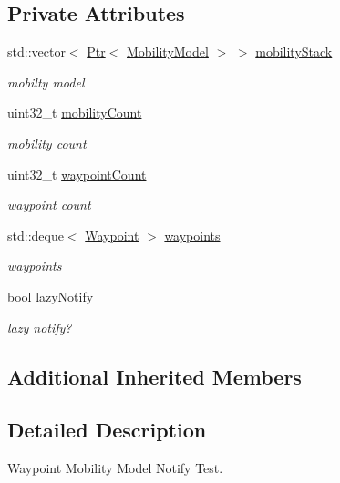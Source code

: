 \subsection*{Private Attributes}
\begin{DoxyCompactItemize}
\item 
std\+::vector$<$ \hyperlink{classns3_1_1Ptr}{Ptr}$<$ \hyperlink{classns3_1_1MobilityModel}{Mobility\+Model} $>$ $>$ \hyperlink{classWaypointMobilityModelNotifyTest_a7e6de57e6fbec72887e4cc25c7e561d3}{mobility\+Stack}
\begin{DoxyCompactList}\small\item\em mobilty model \end{DoxyCompactList}\item 
uint32\+\_\+t \hyperlink{classWaypointMobilityModelNotifyTest_aadb1d796ea62f4f7255539bec44cb6ef}{mobility\+Count}
\begin{DoxyCompactList}\small\item\em mobility count \end{DoxyCompactList}\item 
uint32\+\_\+t \hyperlink{classWaypointMobilityModelNotifyTest_a54c74c8def841c5a4376550ec36b73c5}{waypoint\+Count}
\begin{DoxyCompactList}\small\item\em waypoint count \end{DoxyCompactList}\item 
std\+::deque$<$ \hyperlink{classns3_1_1Waypoint}{Waypoint} $>$ \hyperlink{classWaypointMobilityModelNotifyTest_a2224442f76c902f6f20cf467bbd48914}{waypoints}
\begin{DoxyCompactList}\small\item\em waypoints \end{DoxyCompactList}\item 
bool \hyperlink{classWaypointMobilityModelNotifyTest_ac3f904848852654223a7a823a0c73107}{lazy\+Notify}
\begin{DoxyCompactList}\small\item\em lazy notify? \end{DoxyCompactList}\end{DoxyCompactItemize}
\subsection*{Additional Inherited Members}


\subsection{Detailed Description}
Waypoint Mobility Model Notify Test. 

